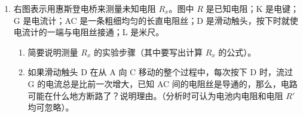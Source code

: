 \documentclass[\gkver]{gaokaozhenti}
\begin{document}
\begin{enumerate}
{$R_{2}=\frac{m_{2}E}{eBB'}$。⑤

代入数值进行计算，

$R_{1}=\frac{63\times1.66\times10^{-27}\times1.00\times10^{5}}{1.60\times10^{-19}\times0.40\times0.50}\Um=0.33\Um$，

$R_{2}=\frac{65\times1.66\times10^{-27}\times1.00\times10^{5}}{1.60\times10^{-19}\times0.40\times0.50}\Um=0.34\Um$。

评分说明：全题 12 分。（1）4 分，（2）4 分，（3）4 分。

（1）中，能正确写出 $F_{1}$ 和 $F_{2}$ 的表达式并指明方向的，各给 1 分。未说明重力可忽略不计的不扣分；能进一步指出只有当 $F_{1}$ 跟 $F_{2}$ 平衡时，铜离子才能穿出 $S'$，并列出①式的，再给 2 分；没有任何说明直接列出①式的，只给 2 分。

（2）中，只写出 $F$ 的表达式并指出 $F$ 跟 $v$ 垂直的，给 1 分；进一步说明 $F$ 就是向心力的，再给 1 分；进一步列出②、③两式的，再各给 1 分，没有任何说明直接列出②、③两式的，给 3 分。

（3）中，只导出④、⑤两式的，各给 1 分；单纯数字计算错误的，扣 1 分；答案中未写单位或单位错误的，扣 1 分。
}

\item
右图表示用惠斯登电桥来测量未知电阻 $R_{x}$。图中 $R$ 是已知电阻；K 是电键；G 是电流计；AC 是一条粗细均匀的长直电阻丝；D 是滑动触头，按下时就使电流计的一端与电阻丝接通；L 是米尺。
\begin{enumerate}
	\item
	简要说明测量 $R_{x}$ 的实验步骤（其中要写出计算 $R_{x}$ 的公式）。
	\item
	如果滑动触头 D 在从 A 向 C 移动的整个过程中，每次按下 D 时，流过 G 的电流总是比前一次增大，已知 AC 间的电阻丝是导通的，那么，电路可能在什么地方断路了？说明理由。（分析时可认为电池内电阻和电阻 $R'$ 均可忽略）。
\end{enumerate}

\end{enumerate}
\end{document}
